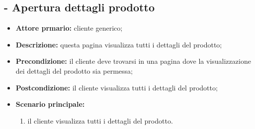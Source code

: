 \stepUserCase
\subsection{ - Apertura dettagli prodotto}
\begin{itemize}
    \item \textbf{Attore prmario:} cliente generico;
    \item \textbf{Descrizione:} questa pagina visualizza tutti i dettagli del prodotto;
    \item \textbf{Precondizione:} il cliente deve trovarsi in una pagina dove la visualizzazione dei dettagli del prodotto sia permessa;
    \item \textbf{Postcondizione:} il cliente visualizza tutti i dettagli del prodotto;
    \item \textbf{Scenario principale:}
          \begin{enumerate}
              \item il cliente visualizza tutti i dettagli del prodotto.
          \end{enumerate}
\end{itemize}

\stepUserCase
